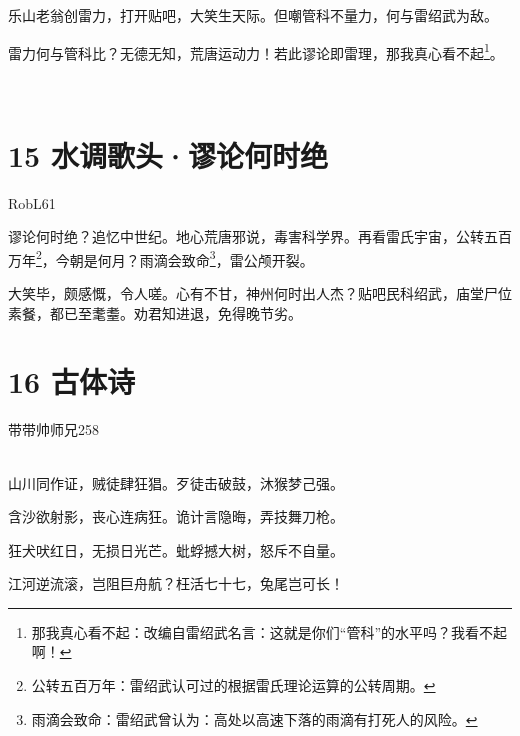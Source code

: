 \documentclass[UTF8,12pt,oneside]{ctexbook}
\begin{document}
        乐山老翁创雷力，打开贴吧，大笑生天际。但嘲管科不量力，何与雷绍武为敌。
        
        雷力何与管科比？无德无知，荒唐运动力！若此谬论即雷理，那我真心看不起\footnote{那我真心看不起：改编自雷绍武名言：这就是你们“管科”的水平吗？我看不起啊！}。
    
    ~\\
    \section{15 水调歌头·谬论何时绝}
    \begin{center}
        RobL61
        
    \end{center}
    
        谬论何时绝？追忆中世纪。地心荒唐邪说，毒害科学界。再看雷氏宇宙，公转五百万年\footnote{公转五百万年：雷绍武认可过的根据雷氏理论运算的公转周期。}，今朝是何月？雨滴会致命\footnote{雨滴会致命：雷绍武曾认为：高处以高速下落的雨滴有打死人的风险。}，雷公颅开裂。
        
        大笑毕，颇感慨，令人嗟。心有不甘，神州何时出人杰？贴吧民科绍武，庙堂尸位素餐，都已至耄耋。劝君知进退，免得晚节劣。
        ~\\
    
    \newpage
    
    \section{16 古体诗}
    \begin{center}
        带带帅师兄258
        
        ~\\
        山川同作证，贼徒肆狂猖。歹徒击破鼓，沐猴梦己强。
        
        含沙欲射影，丧心连病狂。诡计言隐晦，弄技舞刀枪。
        
        狂犬吠红日，无损日光芒。蚍蜉撼大树，怒斥不自量。
        
        江河逆流滚，岂阻巨舟航？枉活七十七，兔尾岂可长！
        
    \end{center}
    
\end{document}
